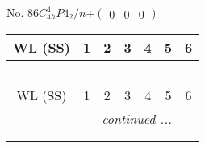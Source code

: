 \documentclass[fleqn,9pt,landscape]{jsarticle}
\begin{document}
\newpage
No. 86\quad$C_{4h}^{4}$\quad$P4_2/n$\quad[ tetragonal ]\quad$+\begin{pmatrix} 0 & 0 & 0 \end{pmatrix}$
\begin{center}
\renewcommand{\arraystretch}{1.2}
\begin{longtable}{ccccccc}
 \hline \hline
WL (SS) & 1 & 2 & 3 & 4 & 5 & 6 \\ \hline \endfirsthead

\multicolumn{6}{l}{\tablename\ \thetable{}} \\
 \hline \hline
WL (SS) & 1 & 2 & 3 & 4 & 5 & 6 \\ \hline \endhead

 \hline \hline
\multicolumn{6}{r}{\footnotesize\it continued ...} \\ \endfoot

 \hline \hline
\multicolumn{6}{r}{} \\ \endlastfoot


\end{longtable}
\end{center}
\end{document}
